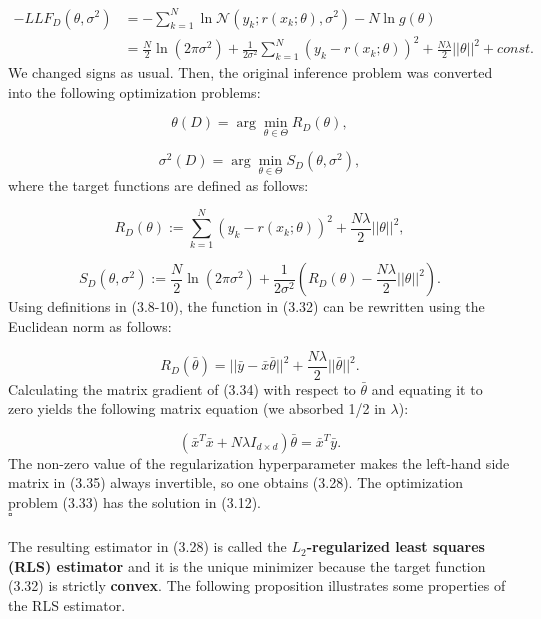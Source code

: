 \documentclass{report}
\begin{document}
\begin{equation}
\begin{split}
-LLF_{D}(\theta,\sigma^2)&=-\sum_{k=1}^N\ln\mathcal{N}(y_k;r(x_k;\theta),\sigma^2) - N\ln g(\theta)\\
&=\frac{N}{2}\ln(2\pi\sigma^2)+\frac{1}{2\sigma^2}\sum_{k=1}^N(y_k-r(x_k;\theta))^2+\frac{N\lambda}{2}||\theta||^2 + const.
\end{split}
\end{equation}
We changed signs as usual. Then, the original inference problem was converted into the following optimization problems:

\begin{equation}
\theta(D) = \arg\min_{\theta \in \Theta} R_{D}(\theta),
\end{equation}

\begin{equation}
\sigma^2(D) = \arg\min_{\theta \in \Theta} S_{D}(\theta,\sigma^2),
\end{equation}
where the target functions are defined as follows:

\begin{equation}
R_{D}(\theta) :=\sum_{k=1}^N(y_k-r(x_k;\theta))^2 + \frac{N\lambda}{2}||\theta||^2,
\end{equation}

\begin{equation}
S_{D}(\theta,\sigma^2) := \frac{N}{2}\ln(2\pi\sigma^2)+\frac{1}{2\sigma^2}\left(R_{D}(\theta)-\frac{N\lambda}{2}||\theta||^2\right).
\end{equation}
Using definitions in (3.8-10), the function in (3.32) can be rewritten using the Euclidean norm as follows:

\begin{equation}
R_{D}(\bar{\theta}) = ||\bar{y} -\bar{x}\bar{\theta}||^2 +\frac{N\lambda}{2}||\bar{\theta}||^2.
\end{equation}
Calculating the matrix gradient of (3.34) with respect to $\bar{\theta}$ and equating it to zero yields the following matrix equation (we absorbed 1/2 in $\lambda$):

\begin{equation}
(\bar{x}^T\bar{x}+ N\lambda I_{d\times d})\bar{\theta} = \bar{x}^T\bar{y}.
\end{equation}
The non-zero value of the regularization hyperparameter makes the left-hand side matrix in (3.35) always invertible, so one obtains (3.28). The optimization problem (3.33) has the solution in (3.12).\\$\square$\\\\
The resulting estimator in (3.28) is called the \textbf{$L_2$-regularized least squares (RLS) estimator} and it is the unique minimizer because the target function (3.32) is strictly \textbf{convex}. The following proposition illustrates some properties of the RLS estimator.
\end{document}
